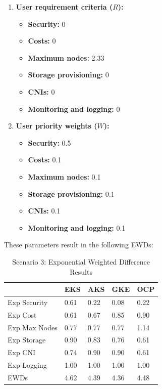 \begin{enumerate}
\def\labelenumi{\arabic{enumi}.}
\tightlist
\item
  \textbf{User requirement criteria (\(R\)):}
    \begin{itemize}
  \tightlist
  \item
    \textbf{Security:} 0
  \item
    \textbf{Costs:} 0
  \item
    \textbf{Maximum nodes:} 2.33
  \item
    \textbf{Storage provisioning:} 0
  \item
    \textbf{CNIs:} 0
  \item
    \textbf{Monitoring and logging:} 0
  \end{itemize}
\item
  \textbf{User priority weights (\(W\)):}

  \begin{itemize}
  \tightlist
  \item
    \textbf{Security:} 0.5
  \item
    \textbf{Costs:} 0.1
  \item
    \textbf{Maximum nodes:} 0.1
  \item
    \textbf{Storage provisioning:} 0.1
  \item
    \textbf{CNIs:} 0.1
  \item
    \textbf{Monitoring and logging:} 0.1
  \end{itemize}
\end{enumerate}

These parameters result in the following EWDs:

\begin{table}[!ht]
    \centering
    \begin{tabular}{|p{4cm}|p{2cm}|p{2cm}|p{2cm}|p{2cm}|} %
    \hline
         & EKS& AKS& GKE& OCP\\ \hline
        Exp Security & 0.61 & 0.22 & 0.08 & 0.22 \\ \hline
        Exp Cost & 0.61 & 0.67 & 0.85 & 0.90 \\ \hline
        Exp Max Nodes & 0.77 & 0.77 & 0.77 & 1.14 \\ \hline
        Exp Storage & 0.90 & 0.83 & 0.76 & 0.61 \\ \hline
        Exp CNI & 0.74 & 0.90 & 0.90 & 0.61 \\ \hline
        Exp Logging & 1.00 & 1.00 & 1.00 & 1.00 \\ \hline
 EWDs& 4.62& 4.39 & 4.36 & 4.48\\\hline
    \end{tabular}
    \caption{Scenario 3: Exponential Weighted Difference Results} 
    \label{tab:scenario-3-ewds}
\end{table}

